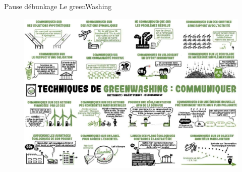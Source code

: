 \begin{frame}{Pause débunkage }{Le greenWashing}
\begin{figure}
    \centering
    \includegraphics[scale=0.235]{chapitre2/wdd3/fig/greenwashing.jpg}
\end{figure}
\end{frame}